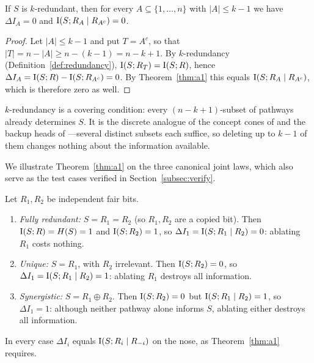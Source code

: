 \begin{theorem}
\label{thm:a2}
If $S$ is $k$-redundant, then for every $A\subseteq\{1,\dots,n\}$ with $\lvert
A\rvert\le k-1$ we have $\Delta I_A=0$ and $\operatorname{I}(S;R_A\mid R_{A^c})=0$.
\end{theorem}

\begin{proof}
Let $\lvert A\rvert\le k-1$ and put $T=A^c$, so that
$\lvert T\rvert=n-\lvert A\rvert\ge n-(k-1)=n-k+1$. By $k$-redundancy
(Definition~\ref{def:redundancy}), $\operatorname{I}(S;R_T)=\operatorname{I}(S;R)$, hence
$\Delta I_A=\operatorname{I}(S;R)-\operatorname{I}(S;R_{A^c})=0$. By Theorem~\ref{thm:a1} this equals
$\operatorname{I}(S;R_A\mid R_{A^c})$, which is therefore zero as well.
\end{proof}

\begin{remark}
$k$-redundancy is a covering condition: every $(n-k+1)$-subset of pathways already
determines $S$. It is the discrete analogue of the concept cones of
\cite{wollschlager2025cones} and the backup heads of \cite{wang2022ioi}---several
distinct subsets each suffice, so deleting up to $k-1$ of them changes nothing about
the information available.
\end{remark}

We illustrate Theorem~\ref{thm:a1} on the three canonical joint laws, which also serve
as the test cases verified in Section~\ref{subsec:verify}.

\begin{example}
\label{ex:three}
Let $R_1,R_2$ be independent fair bits.
\begin{enumerate}[label=(\roman*)]
  \item \emph{Fully redundant:} $S=R_1=R_2$ (so $R_1,R_2$ are a copied bit). Then
    $\operatorname{I}(S;R)=H(S)=1$ and $\operatorname{I}(S;R_2)=1$, so $\Delta I_1=\operatorname{I}(S;R_1\mid R_2)=0$:
    ablating $R_1$ costs nothing.
  \item \emph{Unique:} $S=R_1$, with $R_2$ irrelevant. Then $\operatorname{I}(S;R_2)=0$, so
    $\Delta I_1=\operatorname{I}(S;R_1\mid R_2)=1$: ablating $R_1$ destroys all information.
  \item \emph{Synergistic:} $S=R_1\oplus R_2$. Then $\operatorname{I}(S;R_2)=0$ but
    $\operatorname{I}(S;R_1\mid R_2)=1$, so $\Delta I_1=1$: although neither pathway alone informs
    $S$, ablating either destroys all information.
\end{enumerate}
In every case $\Delta I_i$ equals $\operatorname{I}(S;R_i\mid R_{-i})$ on the nose, as
Theorem~\ref{thm:a1} requires.
\end{example}

